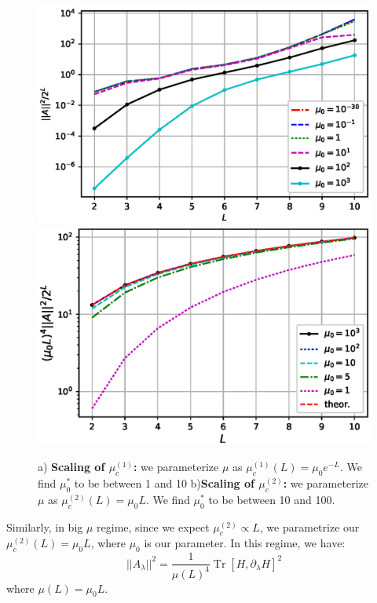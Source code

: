 \documentclass[11pt,a4paper]{article}
\DeclareMathOperator{\Tr}{Tr}
\begin{document}
\begin{figure}[!ht]
\begin{center}
\includegraphics[scale=0.52]{new_pics/scaling_mu_c_1.eps}
\includegraphics[scale=0.52]{new_pics/scaling_mu_c_2.eps}
\caption{a) \textbf{Scaling of  $\mu_c^{(1)}$:} we parameterize $\mu$ as $\mu_c^{(1)}(L)= \mu_0 e^{-L}$. We find $\mu_0^*$ to be between 1 and 10  b)\textbf{Scaling of $\mu_c^{(2)}$:}  we parameterize $\mu$ as $\mu_c^{(2)}(L)= \mu_0 L$. We find $\mu_0^*$ to be between 10 and 100.  }
\label{param_nonintegrable}
\end{center}
\end{figure}

 
Similarly, in big $\mu$ regime, since we expect $\mu_c^{(2)} \propto L$, we parametrize our $\mu_c^{(2)}(L)= \mu_0 L$, where $\mu_0$ is our parameter. In this regime, we have:
\begin{equation}
||A_{\lambda}||^2= \dfrac{1}{ \mu(L)^4} \Tr  [H, \partial_{\lambda}H]^2
\end{equation}
where $\mu(L)= \mu_0 L$. 
\end{document}
